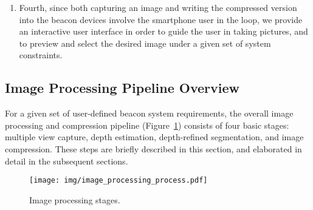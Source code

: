 \begin{enumerate}
	\vspace{.5em}
 \item Fourth, since both capturing an image and writing the compressed version into the beacon devices involve the smartphone user in the loop, we provide an interactive user interface in order to guide the user in taking pictures, and to preview and select the desired image under a given set of system constraints.
\end{enumerate}


\subsection{Image Processing Pipeline Overview}

For a given set of user-defined beacon system requirements, the overall image processing and compression pipeline (Figure~\ref{fig:image_processing_process}) consists of four basic stages: multiple view capture, depth estimation, depth-refined segmentation, and image compression. These steps are briefly described in this section, and elaborated in detail in the subsequent sections.

\begin{figure}[!thb]
    \begin{center}
	    \texttt{[image: img/image\_processing\_process.pdf]}
	    \caption{\footnotesize Image processing stages.}
	    \label{fig:image_processing_process}
	    \vspace{-2em}
    \end{center}
\end{figure}

